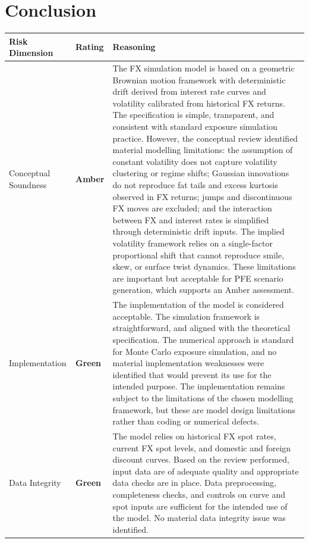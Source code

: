 \section{Conclusion}\label{Conclusion}

\begin{table}[H]
	\centering
	\small
	\renewcommand{\arraystretch}{1.35}
	\begin{tabularx}{\textwidth}{p{4cm}p{2cm}X}
		\toprule
		\textbf{Risk Dimension} & \textbf{Rating} & \textbf{Reasoning} \\
		\midrule
		
		Conceptual Soundness & \textbf{Amber} &
		The FX simulation model is based on a geometric Brownian motion framework with deterministic drift derived from interest rate curves and volatility calibrated from historical FX returns. The specification is simple, transparent, and consistent with standard exposure simulation practice. However, the conceptual review identified material modelling limitations: the assumption of constant volatility does not capture volatility clustering or regime shifts; Gaussian innovations do not reproduce fat tails and excess kurtosis observed in FX returns; jumps and discontinuous FX moves are excluded; and the interaction between FX and interest rates is simplified through deterministic drift inputs. The implied volatility framework relies on a single-factor proportional shift that cannot reproduce smile, skew, or surface twist dynamics. These limitations are important but acceptable for PFE scenario generation, which supports an Amber assessment. \\
		
		Implementation & \textbf{Green} &
		The implementation of the model is considered acceptable. The simulation framework is straightforward, and aligned with the theoretical specification. The numerical approach is standard for Monte Carlo exposure simulation, and no material implementation weaknesses were identified that would prevent its use for the intended purpose. The implementation remains subject to the limitations of the chosen modelling framework, but these are model design limitations rather than coding or numerical defects. \\
		
		Data Integrity & \textbf{Green} &
		The model relies on historical FX spot rates, current FX spot levels, and domestic and foreign discount curves. Based on the review performed, input data are of adequate quality and appropriate data checks are in place. Data preprocessing, completeness checks, and controls on curve and spot inputs are sufficient for the intended use of the model. No material data integrity issue was identified. \\
		

\end{tabularx}
\end{table}
